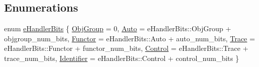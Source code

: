 \subsection*{Enumerations}
\begin{DoxyCompactItemize}
\item 
enum \hyperlink{namespacevt_af182285b57b225b163d5d8aff03cb8c2}{e\+Handler\+Bits} \{ \newline
\hyperlink{namespacevt_af182285b57b225b163d5d8aff03cb8c2ad0350d799a68d110696009c434e5b701}{Obj\+Group} = 0, 
\hyperlink{namespacevt_af182285b57b225b163d5d8aff03cb8c2abfa992da505171200949c7e580e84ea2}{Auto} = e\+Handler\+Bits\+:\+:Obj\+Group + objgroup\+\_\+num\+\_\+bits, 
\hyperlink{namespacevt_af182285b57b225b163d5d8aff03cb8c2ac61e9f48e514369f0eb8ac5cebf9fb14}{Functor} = e\+Handler\+Bits\+:\+:Auto + auto\+\_\+num\+\_\+bits, 
\hyperlink{namespacevt_af182285b57b225b163d5d8aff03cb8c2aee391b103987f3eb488e081ecc1fc5e8}{Trace} = e\+Handler\+Bits\+:\+:Functor + functor\+\_\+num\+\_\+bits, 
\newline
\hyperlink{namespacevt_af182285b57b225b163d5d8aff03cb8c2a3e3fe7a58187c2288f3c2177be08d4d5}{Control} = e\+Handler\+Bits\+:\+:Trace + trace\+\_\+num\+\_\+bits, 
\hyperlink{namespacevt_af182285b57b225b163d5d8aff03cb8c2a4f58efa47c6cfd117a011be7820d1d8a}{Identifier} = e\+Handler\+Bits\+:\+:Control + control\+\_\+num\+\_\+bits
 \}
\end{DoxyCompactItemize}
